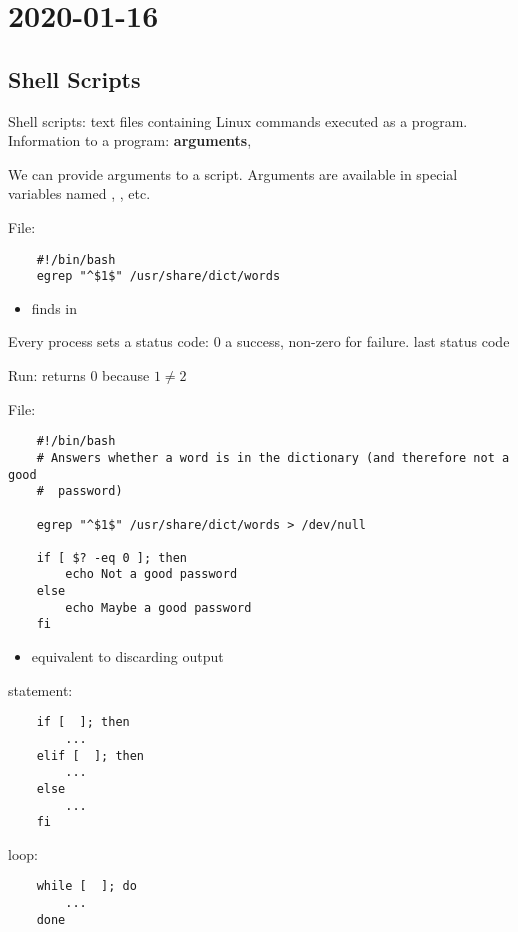 \section{2020-01-16}
\subsection{Shell Scripts}
Shell scripts: text files containing Linux commands executed as a program.
Information to a program: \textbf{arguments}, 

We can provide arguments to a script. Arguments are available in special
variables named , , etc.

File: 
\begin{lstlisting}
    #!/bin/bash
    egrep "^$1$" /usr/share/dict/words
\end{lstlisting}
\begin{itemize}
    \item {} \textrightarrow{} finds  in
\end{itemize}

Every process sets a status code: $ 0 $ a success, non-zero for failure.
 \textrightarrow{} last status code

Run: \code{[ 1 -eq 2]}  \textrightarrow{} returns $ 0 $ because $ 1\neq 2 $

File: 
\begin{lstlisting}
    #!/bin/bash
    # Answers whether a word is in the dictionary (and therefore not a good
    #  password)

    egrep "^$1$" /usr/share/dict/words > /dev/null

    if [ $? -eq 0 ]; then
        echo Not a good password
    else
        echo Maybe a good password
    fi
\end{lstlisting}
\begin{itemize}
    \item {} \textrightarrow{} equivalent to discarding output
\end{itemize}

 statement:
\begin{lstlisting}
    if [  ]; then
        ...
    elif [  ]; then
        ...
    else
        ...
    fi
\end{lstlisting}

 loop:
\begin{lstlisting}
    while [  ]; do
        ...
    done
\end{lstlisting}


